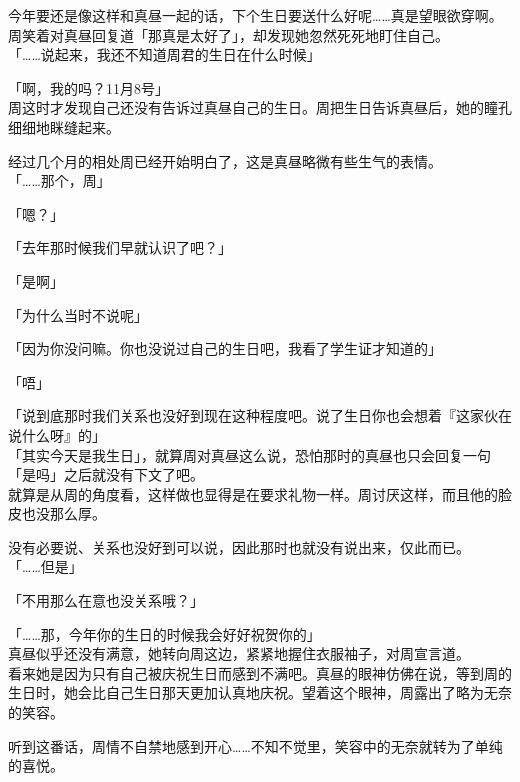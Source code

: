今年要还是像这样和真昼一起的话，下个生日要送什么好呢……真是望眼欲穿啊。\\

周笑着对真昼回复道「那真是太好了」，却发现她忽然死死地盯住自己。\\

「……说起来，我还不知道周君的生日在什么时候」

「啊，我的吗？11月8号」\\

周这时才发现自己还没有告诉过真昼自己的生日。周把生日告诉真昼后，她的瞳孔细细地眯缝起来。

经过几个月的相处周已经开始明白了，这是真昼略微有些生气的表情。\\

「……那个，周」

「嗯？」

「去年那时候我们早就认识了吧？」

「是啊」

「为什么当时不说呢」

「因为你没问嘛。你也没说过自己的生日吧，我看了学生证才知道的」

「唔」

「说到底那时我们关系也没好到现在这种程度吧。说了生日你也会想着『这家伙在说什么呀』的」\\

「其实今天是我生日」，就算周对真昼这么说，恐怕那时的真昼也只会回复一句「是吗」之后就没有下文了吧。\\

就算是从周的角度看，这样做也显得是在要求礼物一样。周讨厌这样，而且他的脸皮也没那么厚。

没有必要说、关系也没好到可以说，因此那时也就没有说出来，仅此而已。\\

「……但是」

「不用那么在意也没关系哦？」

「……那，今年你的生日的时候我会好好祝贺你的」\\

真昼似乎还没有满意，她转向周这边，紧紧地握住衣服袖子，对周宣言道。\\

看来她是因为只有自己被庆祝生日而感到不满吧。真昼的眼神仿佛在说，等到周的生日时，她会比自己生日那天更加认真地庆祝。望着这个眼神，周露出了略为无奈的笑容。

听到这番话，周情不自禁地感到开心……不知不觉里，笑容中的无奈就转为了单纯的喜悦。\\

